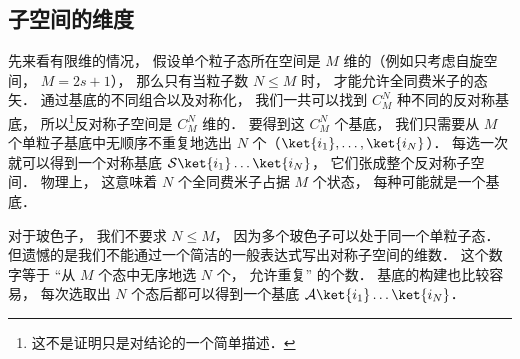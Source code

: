 \subsection{子空间的维度}
先来看有限维的情况， 假设单个粒子态所在空间是 $M$ 维的（例如只考虑自旋空间， $M = 2s+1$）， 那么只有当粒子数 $N \le M$ 时， 才能允许全同费米子的态矢． 通过基底的不同组合以及对称化， 我们一共可以找到 $C_M^N$ 种不同的反对称基底， 所以\footnote{这不是证明只是对结论的一个简单描述．}反对称子空间是 $C_M^N$ 维的． 要得到这 $C_M^N$ 个基底， 我们只需要从 $M$ 个单粒子基底中无顺序不重复地选出 $N$ 个（$\ket{i_1}, \dots, \ket{i_N}$）． 每选一次就可以得到一个对称基底 $\mathcal S \ket{i_1}\dots\ket{i_N}$， 它们张成整个反对称子空间． 物理上， 这意味着 $N$ 个全同费米子占据 $M$ 个状态， 每种可能就是一个基底．

对于玻色子， 我们不要求 $N \le M$， 因为多个玻色子可以处于同一个单粒子态． 但遗憾的是我们不能通过一个简洁的一般表达式写出对称子空间的维数． 这个数字等于 “从 $M$ 个态中无序地选 $N$ 个， 允许重复” 的个数． 基底的构建也比较容易， 每次选取出 $N$ 个态后都可以得到一个基底 $\mathcal A \ket{i_1}\dots\ket{i_N}$．
